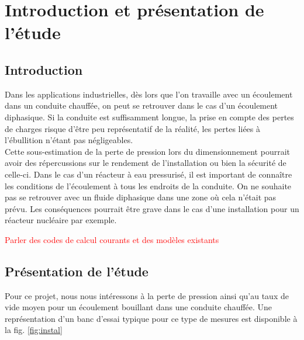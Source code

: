 \section{Introduction et présentation de l'étude\label{section:pres}}

\subsection{Introduction}

Dans les applications industrielles, dès lors que l'on travaille avec un écoulement dans un conduite chauffée, on peut se retrouver dans le cas d'un écoulement diphasique. Si la conduite est suffisamment longue, la prise en compte des pertes de charges risque d'être peu représentatif de la réalité, les pertes liées à l'ébullition n'étant pas négligeables.\\
Cette sous-estimation de la perte de pression lors du dimensionnement pourrait avoir des répercussions sur le rendement de l'installation ou bien la sécurité de celle-ci. Dans le cas d'un réacteur à eau pressurisé, il est important de connaître les conditions de l'écoulement à tous les endroits de la conduite. On ne souhaite pas se retrouver avec un fluide diphasique dans une zone où cela n'était pas prévu. Les conséquences pourrait être grave dans le cas d'une installation pour un réacteur nucléaire par exemple.


\textcolor{red}{Parler des codes de calcul courants et des modèles existants}

\subsection{Présentation de l'étude}

Pour ce projet, nous nous intéressons à la perte de pression ainsi qu'au taux de vide moyen pour un écoulement bouillant dans une conduite chauffée. Une représentation d'un banc d'essai typique pour ce type de mesures est disponible à la fig. \ref{fig:instal}

